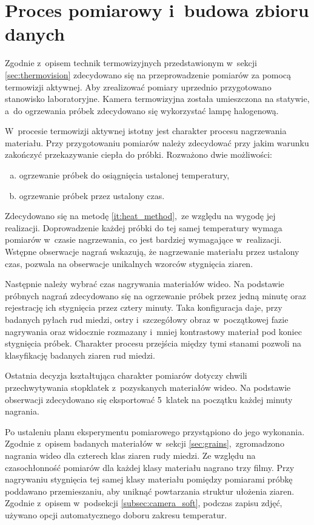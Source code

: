 \section{Proces pomiarowy i~budowa zbioru danych} \label{sec:meas}
Zgodnie z~opisem technik termowizyjnych przedstawionym w~sekcji
\ref{sec:thermovision} zdecydowano się na przeprowadzenie pomiarów za pomocą
termowizji aktywnej.
Aby zrealizować pomiary uprzednio przygotowano stanowisko laboratoryjne.
Kamera termowizyjna została umieszczona na statywie, a~do ogrzewania próbek
zdecydowano się wykorzystać lampę halogenową.

W~procesie termowizji aktywnej istotny jest charakter procesu nagrzewania
materiału.
Przy przygotowaniu pomiarów należy zdecydować przy jakim warunku zakończyć
przekazywanie ciepła do próbki.
Rozważono dwie możliwości:
\begin{enumerate}[a)]
	\item ogrzewanie próbek do osiągnięcia ustalonej temperatury,
	\item \label{it:heat_method}
	      ogrzewanie próbek przez ustalony czas.
\end{enumerate}
Zdecydowano się na metodę \ref{it:heat_method},~ze względu na wygodę jej
realizacji.
Doprowadzenie każdej próbki do tej samej temperatury wymaga pomiarów
w~czasie nagrzewania, co jest bardziej wymagające w~realizacji.
Wstępne obserwacje nagrań wskazują, że nagrzewanie materiału przez ustalony
czas, pozwala na obserwacje unikalnych wzorców stygnięcia ziaren.

Następnie należy wybrać czas nagrywania materiałów wideo.
Na podstawie próbnych nagrań zdecydowano się na ogrzewanie próbek przez jedną
minutę oraz rejestrację ich stygnięcia przez cztery minuty.
Taka konfiguracja daje, przy badanych pyłach rud miedzi, ostry i~szczegółowy
obraz w~początkowej fazie nagrywania oraz widocznie rozmazany i~mniej
kontrastowy materiał pod koniec stygnięcia próbek.
Charakter procesu przejścia między tymi stanami pozwoli na klasyfikację
badanych ziaren rud miedzi.

Ostatnia decyzja kształtująca charakter pomiarów dotyczy chwili
przechwytywania stopklatek z~pozyskanych materiałów wideo.
Na podstawie obserwacji zdecydowano się eksportować 5~klatek na początku
każdej minuty nagrania.

Po ustaleniu planu eksperymentu pomiarowego przystąpiono do jego wykonania.
Zgodnie z~opisem badanych materiałów w~sekcji \ref{sec:grains},~zgromadzono
nagrania wideo dla czterech klas ziaren rudy miedzi.
Ze względu na czasochłonność pomiarów dla każdej klasy materiału nagrano trzy
filmy.
Przy nagrywaniu stygnięcia tej samej klasy materiału pomiędzy pomiarami
próbkę poddawano przemieszaniu, aby uniknąć powtarzania struktur
ułożenia ziaren.
Zgodnie z~opisem w~podsekcji \ref{subsec:camera_soft}, podczas zapisu
zdjęć, używano opcji automatycznego doboru zakresu temperatur.

